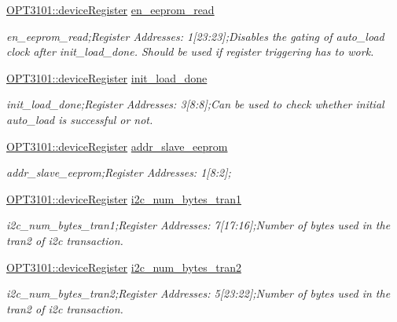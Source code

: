 \begin{DoxyCompactItemize}
\mbox{\hyperlink{class_o_p_t3101_1_1device_register}{O\+P\+T3101\+::device\+Register}} \mbox{\hyperlink{class_o_p_t3101_1_1registers_ad24b621b94dfb11b3ec3b36ea15c2c53}{en\+\_\+eeprom\+\_\+read}}
\begin{DoxyCompactList}\small\item\em en\+\_\+eeprom\+\_\+read;Register Addresses\+: 1\mbox{[}23\+:23\mbox{]};Disables the gating of auto\+\_\+load clock after init\+\_\+load\+\_\+done. Should be used if register triggering has to work. \end{DoxyCompactList}\item 
\mbox{\hyperlink{class_o_p_t3101_1_1device_register}{O\+P\+T3101\+::device\+Register}} \mbox{\hyperlink{class_o_p_t3101_1_1registers_a84cc130f6ccf0b2827e17528cb9b0855}{init\+\_\+load\+\_\+done}}
\begin{DoxyCompactList}\small\item\em init\+\_\+load\+\_\+done;Register Addresses\+: 3\mbox{[}8\+:8\mbox{]};Can be used to check whether initial auto\+\_\+load is successful or not. \end{DoxyCompactList}\item 
\mbox{\hyperlink{class_o_p_t3101_1_1device_register}{O\+P\+T3101\+::device\+Register}} \mbox{\hyperlink{class_o_p_t3101_1_1registers_a1001b38cef654c20b8ef7c3fb4b3e106}{addr\+\_\+slave\+\_\+eeprom}}
\begin{DoxyCompactList}\small\item\em addr\+\_\+slave\+\_\+eeprom;Register Addresses\+: 1\mbox{[}8\+:2\mbox{]}; \end{DoxyCompactList}\item 
\mbox{\hyperlink{class_o_p_t3101_1_1device_register}{O\+P\+T3101\+::device\+Register}} \mbox{\hyperlink{class_o_p_t3101_1_1registers_a1f94d89df7b946472aa65f09dc36f984}{i2c\+\_\+num\+\_\+bytes\+\_\+tran1}}
\begin{DoxyCompactList}\small\item\em i2c\+\_\+num\+\_\+bytes\+\_\+tran1;Register Addresses\+: 7\mbox{[}17\+:16\mbox{]};Number of bytes used in the tran2 of i2c transaction. \end{DoxyCompactList}\item 
\mbox{\hyperlink{class_o_p_t3101_1_1device_register}{O\+P\+T3101\+::device\+Register}} \mbox{\hyperlink{class_o_p_t3101_1_1registers_a664868970effaa22e41d7c6e346f8794}{i2c\+\_\+num\+\_\+bytes\+\_\+tran2}}
\begin{DoxyCompactList}\small\item\em i2c\+\_\+num\+\_\+bytes\+\_\+tran2;Register Addresses\+: 5\mbox{[}23\+:22\mbox{]};Number of bytes used in the tran2 of i2c transaction. \end{DoxyCompactList}\item 

\end{DoxyCompactItemize}
